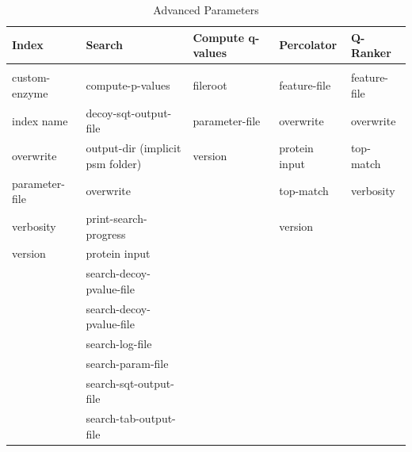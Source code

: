 \documentclass{article}
\begin{document}
\begin{table}
\caption{Advanced Parameters}
\begin{tabular}{lllll}
\textbf{Index}&\textbf{Search}&\textbf{Compute q-values}&\textbf{Percolator} &\textbf{Q-Ranker} \\
\hline \\
custom-enzyme        &compute-p-values                  &fileroot                         &feature-file                     &feature-file                     \\
index name           &decoy-sqt-output-file             &parameter-file                   &overwrite                        &overwrite                        \\
overwrite            &output-dir (implicit psm folder)  &version                          &protein input                    &top-match                        \\
parameter-file       &overwrite                         &                                 &top-match                        &verbosity                        \\
verbosity            &print-search-progress             &                                 &version                          &                                 \\
version              &protein input                     &                                 &                                 &                                 \\
                     &search-decoy-pvalue-file          &                                 &                                 &                                 \\
                     &search-decoy-pvalue-file          &                                 &                                 &                                 \\
                     &search-log-file                   &                                 &                                 &                                 \\
                     &search-param-file                 &                                 &                                 &                                 \\
                     &search-sqt-output-file            &                                 &                                 &                                 \\
                     &search-tab-output-file            &                                 &                                 &                                 \\

\end{tabular}
\end{table}
\end{document}
